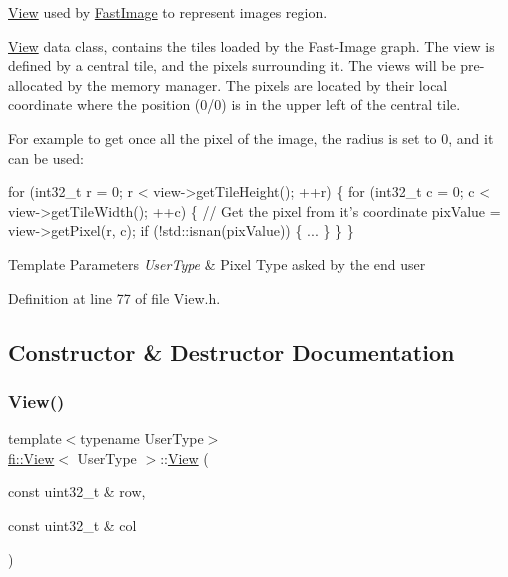 \hyperlink{classfi_1_1View}{View} used by \hyperlink{classfi_1_1FastImage}{Fast\+Image} to represent image\textquotesingle{}s region. 

\hyperlink{classfi_1_1View}{View} data class, contains the tiles loaded by the Fast-\/\+Image graph. The view is defined by a central tile, and the pixels surrounding it. The views will be pre-\/allocated by the memory manager. The pixels are located by their local coordinate where the position (0/0) is in the upper left of the central tile.

For example to get once all the pixel of the image, the radius is set to 0, and it can be used\+:


\begin{DoxyCode}
\textcolor{keywordflow}{for} (int32\_t r = 0; r < view->getTileHeight(); ++r) \{
  \textcolor{keywordflow}{for} (int32\_t c = 0; c < view->getTileWidth(); ++c) \{
    \textcolor{comment}{// Get the pixel from it's coordinate}
    pixValue = view->getPixel(r, c);
    \textcolor{keywordflow}{if} (!std::isnan(pixValue)) \{
      ...
    \}
  \}
\}
\end{DoxyCode}



\begin{DoxyTemplParams}{Template Parameters}
{\em User\+Type} & Pixel Type asked by the end user \\
\hline
\end{DoxyTemplParams}


Definition at line 77 of file View.\+h.



\subsection{Constructor \& Destructor Documentation}
\mbox{\label{classfi_1_1View_a08c083035ccc805607ce81bfc199443f}} 
\subsubsection{\texorpdfstring{View()}{View()}}
{\footnotesize\ttfamily template$<$typename User\+Type$>$ \\
\hyperlink{classfi_1_1View}{fi\+::\+View}$<$ User\+Type $>$\+::\hyperlink{classfi_1_1View}{View} (\begin{DoxyParamCaption}\item[{const uint32\+\_\+t \&}]{row,  }\item[{const uint32\+\_\+t \&}]{col }\end{DoxyParamCaption})\hspace{0.3cm}{\ttfamily [inline]}}



